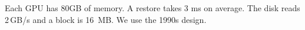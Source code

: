 \documentclass{article}
\begin{document}
Each GPU has 80GB of memory.
A restore takes 3 ms on average.
The disk reads 2\,GB/s and a block is 16~MB.
We use the 1990s design.
\end{document}
